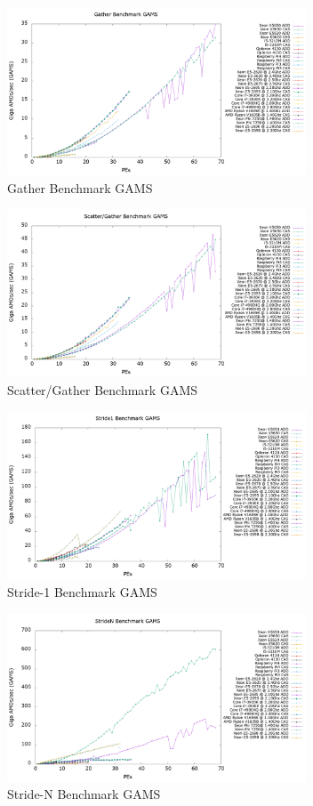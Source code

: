 \begin{figure}[!t]
\centering
\includegraphics[width=3.5in]{figures/GATHER_GAMS.png}
\caption{Gather Benchmark GAMS}
\label{fig:gather_gams}
\end{figure}

\begin{figure}[!t]
\centering
\includegraphics[width=3.5in]{figures/SG_GAMS.png}
\caption{Scatter/Gather Benchmark GAMS}
\label{fig:sg_gams}
\end{figure}

\begin{figure}[!t]
\centering
\includegraphics[width=3.5in]{figures/STRIDE1_GAMS.png}
\caption{Stride-1 Benchmark GAMS}
\label{fig:s1_gams}
\end{figure}

\begin{figure}[!t]
\centering
\includegraphics[width=3.5in]{figures/STRIDEN_GAMS.png}
\caption{Stride-N Benchmark GAMS}
\label{fig:sn_gams}
\end{figure}